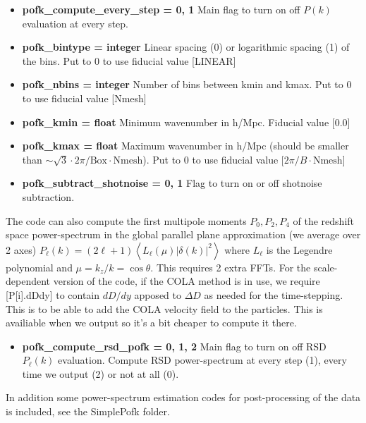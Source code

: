\documentclass[usenatbib]{article}
\begin{document}
\begin{itemize}

\item \textbf{pofk\_compute\_every\_step = 0, 1} Main flag to turn on off $P(k)$ evaluation at every step.

\item \textbf{pofk\_bintype = integer} Linear spacing (0) or logarithmic spacing (1) of the bins. Put to 0 to use fiducial value [LINEAR]

\item \textbf{pofk\_nbins = integer} Number of bins between kmin and kmax. Put to 0 to use fiducial value [Nmesh]

\item \textbf{pofk\_kmin = float} Minimum wavenumber in h/Mpc. Fiducial value [0.0]

\item \textbf{pofk\_kmax = float} Maximum wavenumber in h/Mpc (should be smaller than $\sim \sqrt{3}\cdot 2\pi/\text{Box}\cdot\text{Nmesh}$). Put to 0 to use fiducial value [$2\pi/B\cdot \text{Nmesh}$]

\item \textbf{pofk\_subtract\_shotnoise = 0, 1} Flag to turn on or off shotnoise subtraction.

\end{itemize}

The code can also compute the first multipole moments $P_0,P_2,P_4$ of the redshift space power-spectrum in the global parallel plane approximation (we average over 2 axes) $P_\ell(k) = (2\ell+1)\left<L_\ell(\mu)|\delta(k)|^2\right>$ where $L_\ell$ is the Legendre polynomial and $\mu = k_z/k = \cos\theta$. This requires 2 extra FFTs. For the scale-dependent version of the code, if the COLA method is in use, we require [P[i].dDdy] to contain $dD/dy$ apposed to $\Delta D$ as needed for the time-stepping. This is to be able to add the COLA velocity field to the particles. This is availiable when we output so it's a bit cheaper to compute it there.

\begin{itemize}
\item \textbf{pofk\_compute\_rsd\_pofk = 0, 1, 2} Main flag to turn on off RSD $P_\ell(k)$ evaluation. Compute RSD power-spectrum at every step (1), every time we output (2) or not at all (0).
\end{itemize}

In addition some power-spectrum estimation codes for post-processing of the data is included, see the SimplePofk folder.
\end{document}
